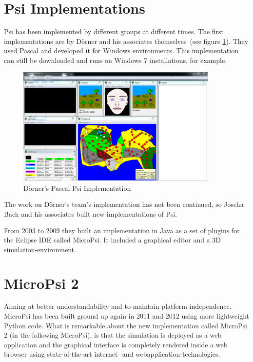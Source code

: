 
    \section{Psi Implementations}
Psi has been implemented by different groups at different times. The first implementations are by Dörner and his associates themselves~(see figure \ref{psi_screen}). They used Pascal and developed it for Windows environments. This implementation can still be downloaded and runs on Windows 7 installations, for example.

\begin{figure}[h]
  \centering
    \includegraphics[width=10cm]{graphics/psi_screen1}
  \caption{Dörner's Pascal Psi Implementation}
  \label{psi_screen}
\end{figure}

The work on Dörner's team's implementation has not been continued, so Joscha Bach and his associates built new implementations of Psi.

From 2003 to 2009 they built an implementation in Java as a set of plugins for the Eclipse IDE called MicroPsi. It included a graphical editor and a 3D simulation-environment. 

    \section{MicroPsi 2}
Aiming at better understandability and to maintain platform independence, MicroPsi has been built ground up again in 2011 and 2012 using more lightweight Python code. What is remarkable about the new implementation called MicroPsi 2 (in the following MicroPsi), is that the simulation is deployed as a web application and the graphical interface is completely rendered inside a web browser using state-of-the-art internet- and webapplication-technologies.~\cite{conf/agi/Bach12}
        
